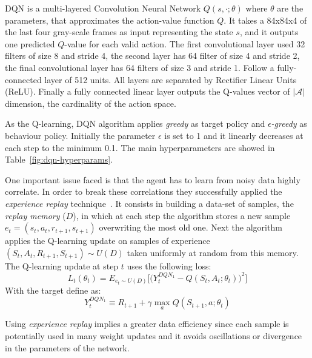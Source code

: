 DQN is a multi-layered Convolution Neural Network $Q(s, \cdotp; \theta)$ where $\theta$ are the parameters, that approximates the action-value function $Q$. It takes a 84x84x4 of the last four gray-scale frames as input representing the state $s$, and it outputs one predicted $Q$-value for each valid action.  
The first convolutional layer used 32 filters of size 8 and stride 4, the second layer has 64 filter of size 4 and stride 2, the final convolutional layer has 64 filters of size 3 and stride 1. Follow a fully-connected layer of 512 units. All layers are separated by Rectifier Linear Units (ReLU). Finally a fully connected linear layer outputs the Q-values vector of $|\mathcal{A}|$ dimension, the cardinality of the action space.

As the Q-learning, DQN algorithm applies \textit{greedy} as target policy and \textit{$\epsilon$-greedy} as behaviour policy. Initially the parameter $\epsilon$ is set to 1 and it linearly decreases at each step to the minimum 0.1. The main hyperparameters are showed in Table~\ref{fig:dqn-hyperparams}.

One important issue faced is that the agent has to learn from noisy data highly correlate. In order to break these correlations they successfully applied the \textit{experience replay} technique~\cite{Lin:1992:RLR:168871}. It consists in building a data-set of samples, the \textit{replay memory} ($D$), in which at each step the algorithm stores a new sample $e_t = (s_t, a_t, r_{t+1}, s_{t+1})$ overwriting the most old one. Next the algorithm applies the Q-learning update on samples of experience $(S_t, A_t, R_{t+1}, S_{t+1}) \sim U(D)$ taken uniformly at random from this memory. The Q-learning update at step $t$ uses the following loss:
\begin{equation}
	L_t(\theta_t) = E_{e_t \sim U(D)} %
		\Big[ \Big( Y^{DQN_1}_t - Q(S_t, A_t;\theta_t) \Big)^2 \Big]
\end{equation}
With the target define as:
\begin{equation}
Y^{DQN_1}_t \equiv R_{t+1} + \gamma \max_{a} Q(S_{t+1}, a; \theta_t)
\end{equation}

Using \textit{experience replay} implies a greater data efficiency since each sample is potentially used in many weight updates and it avoids oscillations or divergence in the parameters of the network.


